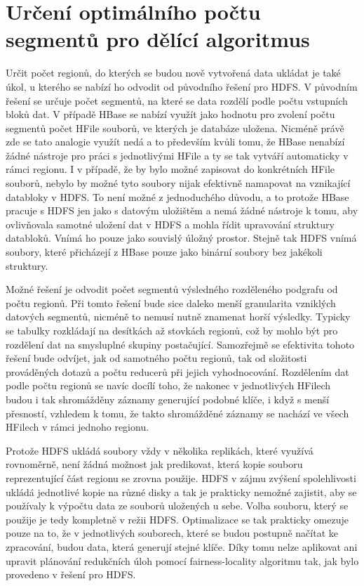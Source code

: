 \documentclass[thesis=M,czech]{FITthesis}[2012/06/26]
\begin{document}
\section{Určení optimálního počtu segmentů pro dělící algoritmus}
Určit počet regionů, do kterých se budou nově vytvořená data ukládat je také úkol, u kterého se nabízí ho odvodit od původního řešení pro HDFS. V původním řešení se určuje počet segmentů, na které se data rozdělí podle počtu vstupních bloků dat. V případě HBase se nabízí využít jako hodnotu pro zvolení počtu segmentů počet HFile souborů, ve kterých je databáze uložena. Nicméně právě zde se tato analogie využít nedá a to především kvůli tomu, že HBase nenabízí žádné nástroje pro práci s jednotlivými HFile a ty se tak vytváří automaticky v rámci regionu. I v případě, že by bylo možné zapisovat do konkrétních HFile souborů, nebylo by možné tyto soubory nijak efektivně namapovat na vznikající databloky v HDFS. To není možné z jednoduchého důvodu, a to protože HBase pracuje s HDFS jen jako s datovým uložištěm a nemá žádné nástroje k tomu, aby ovlivňovala samotné uložení dat v HDFS a mohla řídit upravování struktury databloků. Vnímá ho pouze jako souvislý úložný prostor. Stejně tak HDFS vnímá soubory, které přicházejí z HBase pouze jako binární soubory bez jakékoli struktury.

Možné řešení je odvodit počet segmentů výsledného rozděleného podgrafu od počtu regionů. Při tomto řešení bude sice daleko menší granularita vzniklých datových segmentů, nicméně to nemusí nutně znamenat horší výsledky. Typicky se tabulky rozkládají na desítkách až stovkách regionů, což by mohlo být pro rozdělení dat na smysluplné skupiny postačující. Samozřejmě se efektivita tohoto řešení bude odvíjet, jak od samotného počtu regionů, tak od složitosti prováděných dotazů a počtu reducerů při jejich vyhodnocování. Rozdělením dat podle počtu regionů se navíc docílí toho, že nakonec v jednotlivých HFilech budou i tak shromážděny záznamy generující podobné klíče, i když s menší přesností, vzhledem k tomu, že takto shromážděné záznamy se nachází ve všech HFilech v rámci jednoho regionu.

Protože HDFS ukládá soubory vždy v několika replikách, které využívá rovnoměrně, není žádná možnost jak predikovat, která kopie souboru reprezentující část regionu se zrovna použije. HDFS v zájmu zvýšení spolehlivosti ukládá jednotlivé kopie na různé disky a tak je prakticky nemožné zajistit, aby se používaly k výpočtu data ze souborů uložených u sebe. Volba souboru, který se použije je tedy kompletně v režii HDFS. Optimalizace se tak prakticky omezuje pouze na to, že v jednotlivých souborech, které se budou postupně načítat ke zpracování, budou data, která generují stejné klíče. Díky tomu nelze aplikovat ani upravit plánování redukčních úloh pomocí fairness-locality algoritmu tak, jak bylo provedeno v řešení pro HDFS. 
\end{document}
